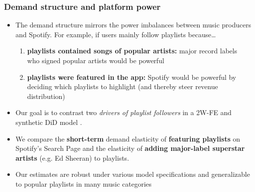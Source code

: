 \documentclass[8pt]{beamer}
\begin{document}


\begin{frame}[label=shortversion]

\frametitle{Demand structure and platform power}

	\begin{itemize}
	\item The demand structure mirrors the power imbalances between music producers and Spotify. For example, if users mainly follow playlists because\dots
	
	\begin{enumerate}
	\item \textbf{playlists contained songs of popular artists:} major record labels who signed popular artists would be powerful
	\item \textbf{playlists were featured in the app:} Spotify would be powerful by deciding which playlists to highlight (and thereby steer revenue distribution)
    \end{enumerate}
	\vspace{.2cm}
\item Our goal is to contrast two \textit{drivers of playlist followers} in a 2W-FE \citep[e.g.,][]{shapiro_hitsch_tuchman_2021} and synthetic DiD model \citep{SDiD_AER_Arkhangelsky_21}.

\item We compare the \textbf{short-term} demand elasticity of \textbf{featuring playlists} on Spotify's Search Page and the elasticity of \textbf{adding major-label superstar artists} (e.g. Ed Sheeran) to playlists. 

\item Our estimates are robust under various model specifications and generalizable to popular playlists in many music categories

\end{itemize}

\end{frame}

\end{document}
